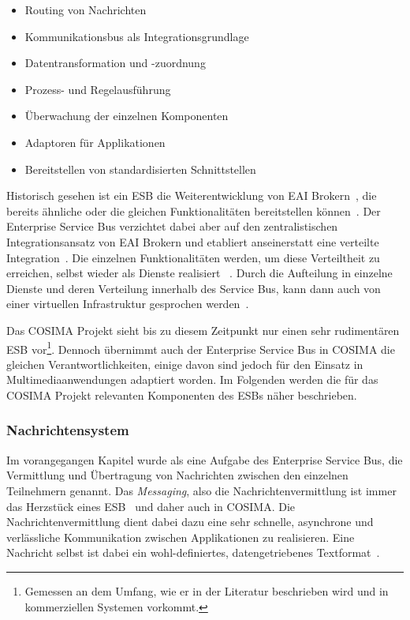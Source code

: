   \begin{itemize}
    \item Routing von Nachrichten
    \item Kommunikationsbus als Integrationsgrundlage
    \item Datentransformation und -zuordnung
    \item Prozess- und Regelausführung
    \item Überwachung der einzelnen Komponenten
    \item Adaptoren für Applikationen
    \item Bereitstellen von standardisierten Schnittstellen
  \end{itemize}

  Historisch gesehen ist ein ESB die Weiterentwicklung von EAI Brokern~, die bereits ähnliche oder die gleichen Funktionalitäten bereitstellen können~\citep[S. 146]{masak2007ssb}. Der Enterprise Service Bus verzichtet dabei aber auf den zentralistischen Integrationsansatz von EAI Brokern und etabliert anseinerstatt eine verteilte Integration~\citep[S. 4]{enterprise_service_bus}. Die einzelnen Funktionalitäten werden, um diese Verteiltheit zu erreichen, selbst wieder als Dienste realisiert ~\citep{enterprise_service_bus,masak2007ssb,papazoglou2007soc}. Durch die Aufteilung in einzelne Dienste und deren Verteilung innerhalb des Service Bus, kann dann auch von einer virtuellen Infrastruktur gesprochen werden~\citep[S. 136]{soa_goes_real}.
  
  Das COSIMA Projekt sieht bis zu diesem Zeitpunkt nur einen sehr rudimentären ESB vor\footnote{Gemessen an dem Umfang, wie er in der Literatur beschrieben wird und in kommerziellen Systemen vorkommt.}. Dennoch übernimmt auch der Enterprise Service Bus in COSIMA die gleichen Verantwortlichkeiten, einige davon sind jedoch für den Einsatz in Multimediaanwendungen adaptiert worden. Im Folgenden werden die für das COSIMA Projekt relevanten Komponenten des ESBs näher beschrieben.
  
\subsubsection{Nachrichtensystem} %
\label{ssub:nachrichtensystem}
  
  Im vorangegangen Kapitel wurde als eine Aufgabe des Enterprise Service Bus, die Vermittlung und Übertragung von Nachrichten zwischen den einzelnen Teilnehmern genannt. Das \emph{Messaging}, also die Nachrichtenvermittlung ist immer das Herzstück eines ESB~\citep[S. 77]{enterprise_service_bus} und daher auch in COSIMA. Die Nachrichtenvermittlung dient dabei dazu eine sehr schnelle, asynchrone und verlässliche Kommunikation zwischen Applikationen zu realisieren. Eine Nachricht selbst ist dabei ein wohl-definiertes, datengetriebenes Textformat~\citep[S. 60f]{web_services_principles_and_technology}.
  
